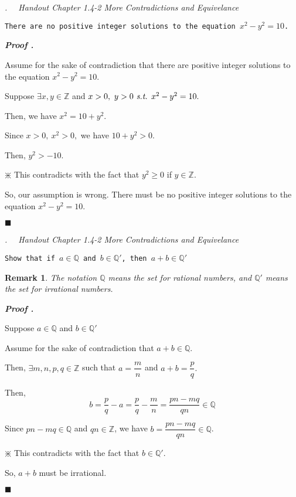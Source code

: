 \documentclass[10pt,letter]{article}
\newcounter{nq}[section]
\newcounter{np}[section]
\newtheorem*{rmk}{\indent Remark}
\newenvironment*{p}{\par\noindent\textbf{\textit{Proof \stepcounter{np}\thenp. }}\par}{\par\hfill $\blacksquare$\par}
\newenvironment*{q}[1]{\noindent\emph{\thesection.\stepcounter{nq}\thenq$\quad $ #1}\par\noindent\texttt}{}
\def\Z{{\mathbb{Z}}}
\def\Q{{\mathbb{Q}}}
\def\st{\emph{ s.t. }}
\begin{document}
\begin{framed}\begin{q}
	{Handout Chapter 1.4-2 More Contradictions and Equivelance}
	{There are no positive integer solutions to the equation $x^2-y^2=10$.}
\end{q}\end{framed}
\begin{p}
	Assume for the sake of contradiction that there are positive integer solutions to the equation $x^2-y^2=10.$\par Suppose $\exists x,y\in\Z$ and $x>0,\ y>0\st x^2-y^2=10.$\par Then, we have $x^2=10+y^2.$\par Since $x>0,\ x^2>0,$ we have $10+y^2>0.$\par Then, $y^2>-10.$\par\begin{center}$\divideontimes$ This contradicts with the fact that $y^2\geq0$ if $y\in\Z.$\end{center}\par So, our assumption is wrong. There must be no positive integer solutions to the equation $x^2-y^2=10.$
\end{p}

\begin{framed}\begin{q}
	{Handout Chapter 1.4-2 More Contradictions and Equivelance}
	{Show that if $a\in\Q$ and $b\in\Q'$, then $a+b\in\Q'$}
	\begin{rmk}
		The notation $\Q$ means the set for rational numbers, and $\Q'$ means the set for irrational numbers.
	\end{rmk}
\end{q}\end{framed}
\begin{p}
	Suppose $a\in\Q$ and $b\in\Q'$\par Assume for the sake of contradiction that $a+b\in\Q$.\par Then, $\exists m,n,p,q\in\Z$ such that $a=\dfrac{m}{n}$ and $a+b=\dfrac{p}{q}.$\par Then, \[b=\frac{p}{q}-a=\frac{p}{q}-\frac{m}{n}=\frac{pn-mq}{qn}\in\Q\]\par Since $pn-mq\in\Q$ and $qn\in\Z$, we have $b=\dfrac{pn-mq}{qn}\in\Q$.\par\begin{center}$\divideontimes$ This contradicts with the fact that $b\in\Q'$. \end{center}\par So, $a+b$ must be irrational. 
\end{p}
\end{document}
